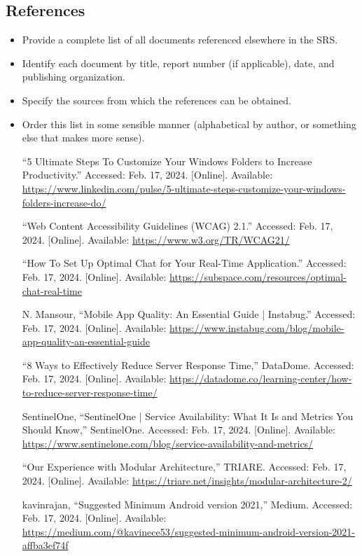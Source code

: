 \documentclass[]{article}
\begin{document}
\subsection{References}
\label{sub:references}
\begin{itemize}
	\item Provide a complete list of all documents referenced elsewhere in the SRS.
	\item Identify each document by title, report number (if applicable), date, and publishing organization.
	\item Specify the sources from which the references can be obtained.
	\item Order this list in some sensible manner (alphabetical by author, or something else that makes more sense).
	\begin{thebibliography}{99}
		 “5 Ultimate Steps To Customize Your Windows Folders to Increase Productivity.” Accessed: Feb. 17, 2024. [Online]. Available: \url{https://www.linkedin.com/pulse/5-ultimate-steps-customize-your-windows-folders-increase-do/}
		
		 “Web Content Accessibility Guidelines (WCAG) 2.1.” Accessed: Feb. 17, 2024. [Online]. Available: \url{https://www.w3.org/TR/WCAG21/}
		
		 “How To Set Up Optimal Chat for Your Real-Time Application.” Accessed: Feb. 17, 2024. [Online]. Available: \url{https://subspace.com/resources/optimal-chat-real-time}
		
		 N. Mansour, “Mobile App Quality: An Essential Guide | Instabug.” Accessed: Feb. 17, 2024. [Online]. Available: \url{https://www.instabug.com/blog/mobile-app-quality-an-essential-guide}
		
		 “8 Ways to Effectively Reduce Server Response Time,” DataDome. Accessed: Feb. 17, 2024. [Online]. Available: \url{https://datadome.co/learning-center/how-to-reduce-server-response-time/}
		
		 SentinelOne, “SentinelOne | Service Availability: What It Is and Metrics You Should Know,” SentinelOne. Accessed: Feb. 17, 2024. [Online]. Available: \url{https://www.sentinelone.com/blog/service-availability-and-metrics/}
		
		 “Our Experience with Modular Architecture,” TRIARE. Accessed: Feb. 17, 2024. [Online]. Available: \url{https://triare.net/insights/modular-architecture-2/}
		
		 kavinrajan, “Suggested Minimum Android version 2021,” Medium. Accessed: Feb. 17, 2024. [Online]. Available: \url{https://medium.com/@kavinece53/suggested-minimum-android-version-2021-affba3ef74f}
		

\end{thebibliography}
\end{itemize}
\end{document}
